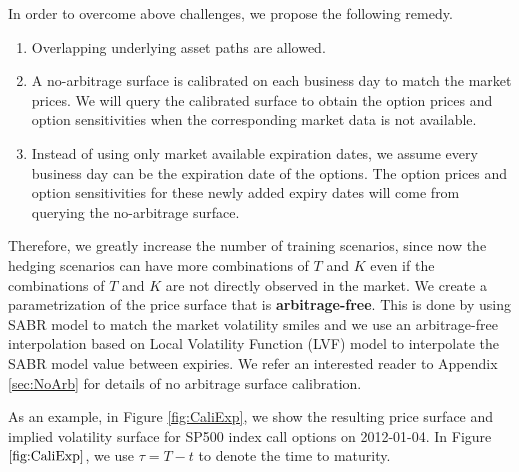 \documentclass[letterpaper,12pt,titlepage,oneside,final]{book}
\numberwithin{equation}{section}
\theoremstyle{definition}
\begin{document}
In order to overcome  above challenges, we propose the following remedy.  
\begin{enumerate}
	\item Overlapping underlying asset paths are allowed.
	\item A no-arbitrage  surface is calibrated on each business day to match the market prices. We will query the calibrated surface to obtain the option prices and option sensitivities when the corresponding market data is not available. 
	\item Instead of using only market available expiration dates, we assume every business day can be the expiration date of the options. The option prices and option sensitivities for these newly added expiry dates will come from querying the no-arbitrage  surface.
\end{enumerate}


Therefore, we greatly increase the number of training scenarios, since now the hedging scenarios can have more combinations of $T$ and $K$ even if the combinations of $T$ and $K$ are not directly observed in the market. 
We create a parametrization of the price surface that is \textbf{arbitrage-free}.  This is done by using SABR model to match the market volatility smiles and we use an arbitrage-free interpolation based on Local Volatility Function (LVF) model to interpolate the SABR model value between expiries. We refer an interested reader to Appendix \ref{sec:NoArb} for details of no arbitrage surface calibration.


As an example, in Figure \ref{fig:CaliExp}, we show the resulting price surface and implied  volatility surface for SP500 index call options  on 2012-01-04. In Figure $\ref{fig:CaliExp}$, we use $\tau=T-t$ to denote the time to maturity.  
\end{document}
